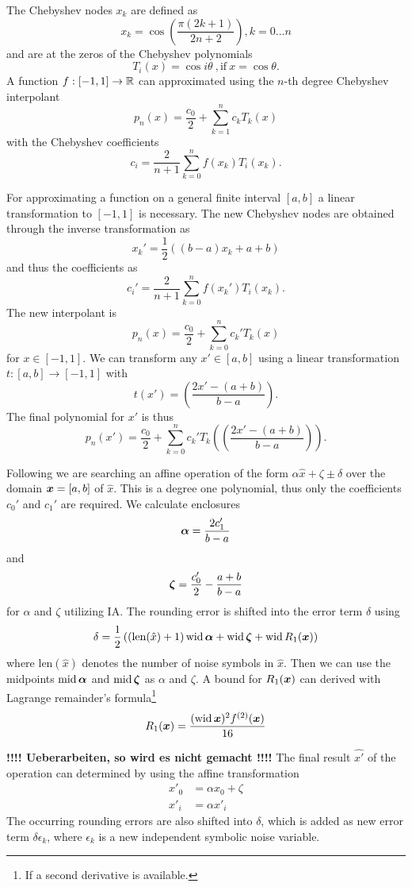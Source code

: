 \documentclass[a4]{scrartcl}
\newcommand{\iv}[2]{\ensuremath{[#1, #2]}\xspace}
\newcommand{\aff}[1]{\ensuremath{\hat{#1}}\xspace}
\newcommand{\yalaa}{\texttt{YalAA}\xspace}
\begin{document}
The Chebyshev nodes $x_k$ are defined as
\[
x_k = \cos \left ( \frac{\pi (2k+1)}{2n+2} \right ), k=0...n
\]
and are at the zeros of the Chebyshev polynomials
\[
T_i(x) = \cos i \theta \mathrm{\ ,if\ } x = \cos \theta .
\]
A function $f: \iv{-1}{1} \rightarrow \Rz$ can approximated using the $n$-th degree
Chebyshev interpolant
\[
p_n(x) = \frac{ c_0}{ 2} + \sum \limits_{k=1}^n c_kT_k(x)
\]
with the Chebyshev coefficients
\[
c_i = \frac{2}{n+1} \sum \limits_{k=0}^n f(x_k)T_i(x_k) .
\]

For approximating a function on a general finite interval $\iv{a}{b}$ a linear
transformation to $\iv{-1}{1}$ is necessary. The new Chebyshev nodes
are obtained through the inverse transformation as
\[
x_k' = \frac{1}{2}\left ( (b-a)x_k + a + b \right )
\]
and thus the coefficients as
\[
c_i' = \frac{2}{n+1} \sum \limits_{k=0}^n f(x_k')T_i(x_k) .
\]
The new interpolant is 
\[
p_n(x) = \frac{c_0}{2} + \sum \limits_{k=0}^n c_k' T_k(x) 
\]
for $x \in \iv{-1}{1}$. We can transform any $x' \in \iv{a}{b}$ using a
linear transformation $t: \iv{a}{b} \rightarrow \iv{-1}{1}$ with
\[
t(x') = \left ( \frac{2x' - (a+b)}{b-a}\right) .
\]
The final polynomial for $x'$ is thus
\[
p_n(x') = \frac{c_0}{2} + \sum \limits_{k=0}^n c_k' T_k(\left ( \frac{2x' - (a+b)}{b-a}\right)) .
\]

Following \cite{stolfi1997} we are searching an affine operation of the form
$\alpha \aff x + \zeta \pm \delta$ over the domain $\x = \iv{a}{b}$ of $\aff x$.
This is a degree one polynomial, thus only the coefficients $c_0'$ and $c_1'$
are required. We calculate enclosures
\[
\ialpha = \frac{2 c_1'}{b-a}
\]
and
\[
\izeta = \frac{c_0'}{2} - \frac{a+b}{b-a}
\]
for $\alpha$ and $\zeta$ utilizing IA. The rounding error is shifted into the
error term $\delta$ using
\[
\delta = \frac 1 2 \left ( \left (\mathrm{len}(\aff x) + 1 \right )\wid \ialpha + \wid \izeta  +
  \wid R_1(\x) \right) 
\]
where $\mathrm{len}(\aff x)$ denotes the number of noise symbols in $\aff x$.
Then we can use the midpoints $\imid \ialpha$ and $\imid \izeta$ as $\alpha$ and
$\zeta$. A bound for $R_1(\x)$ can derived with Lagrange remainder's
formula\footnote{If a second derivative is available.}
\[
R_1(\x) = \frac{(\wid \x)^2 f^{(2)}(\x)}{16}
\]

\textbf{!!!! Ueberarbeiten, so wird es nicht gemacht !!!!}
The final result $\aff{x'}$ of the operation can determined by using the
affine transformation
\[
\begin{array}{ll}
  x'_0 &= \alpha x_0 + \zeta\\
  x'_i &= \alpha x'_i   
\end{array}
\]
The occurring rounding errors are also shifted into $\delta$, which is added
as new error term $\delta \epsilon_k$, where $\epsilon_k$ is a new independent
symbolic noise variable. 
\end{document}

